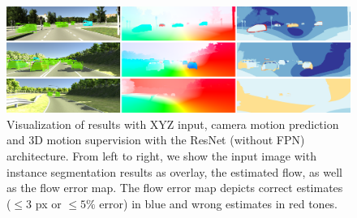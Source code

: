 \begin{figure}[t]
  \centering
  \includegraphics[width=\textwidth]{figures/vkitti_cam}
\caption{
Visualization of results with XYZ input, camera motion prediction and 3D motion supervision
with the ResNet (without FPN) architecture.
From left to right, we show the input image with instance segmentation results as overlay,
the estimated flow, as well as the flow error map.
The flow error map depicts correct estimates ($\leq 3$ px or $\leq 5\%$ error) in blue and wrong estimates in red tones.
}
\label{figure:vkitti}
\end{figure}


